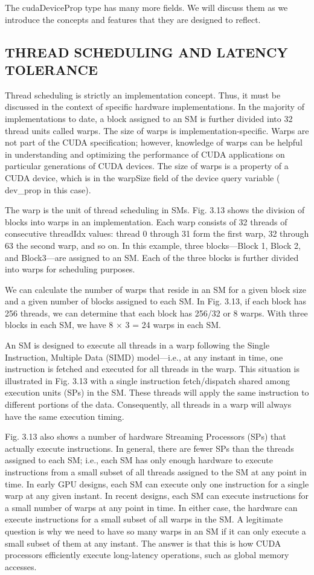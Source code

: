 \documentclass[11pt]{ctexart}
\begin{document}
The cudaDeviceProp type has many more fields. We will discuss them as we
introduce the concepts and features that they are designed to reflect.

\subsection{THREAD SCHEDULING AND LATENCY TOLERANCE}

Thread scheduling is strictly an implementation concept. Thus, it must be discussed in the context of specific hardware implementations. In the majority of implementations to date, a block assigned to an SM is further divided into 32 thread units called warps. The size of warps is implementation-specific. Warps are not part of the CUDA specification; however, knowledge of warps can be helpful in understanding
and optimizing the performance of CUDA applications on particular generations of CUDA devices. The size of warps is a property of a CUDA device, which is in the warpSize field of the device query variable ( dev\_prop in this case).

The warp is the unit of thread scheduling in SMs. Fig. 3.13 shows the division
of blocks into warps in an implementation. Each warp consists of 32 threads of consecutive threadIdx values: thread 0 through 31 form the first warp, 32 through 63 the second warp, and so on. In this example, three blocks—Block 1, Block 2, and Block3—are assigned to an SM. Each of the three blocks is further divided into warps for scheduling purposes.

We can calculate the number of warps that reside in an SM for a given block size and a given number of blocks assigned to each SM. In Fig. 3.13, if each block has 256 threads, we can determine that each block has 256/32 or 8 warps. With three blocks in each SM, we have 8 × 3 = 24 warps in each SM.

An SM is designed to execute all threads in a warp following the Single
Instruction, Multiple Data (SIMD) model—i.e., at any instant in time, one instruction is fetched and executed for all threads in the warp. This situation is illustrated in Fig. 3.13 with a single instruction fetch/dispatch shared among execution units (SPs) in the SM. These threads will apply the same instruction to different portions of the data. Consequently, all threads in a warp will always have the same execution timing.

Fig. 3.13 also shows a number of hardware Streaming Processors (SPs) that actually execute instructions. In general, there are fewer SPs than the threads assigned to each SM; i.e., each SM has only enough hardware to execute instructions from a small subset of all threads assigned to the SM at any point in time. In early GPU designs, each SM can execute only one instruction for a single warp at any given instant. In recent designs, each SM can execute instructions for a small number of warps at any point in time. In either case, the hardware can execute instructions for a small subset of all warps in the SM. A legitimate question is why we need to have so many warps in an SM if it can only execute a small subset of them at any instant. The answer is that this is how CUDA processors efficiently execute long-latency operations, such as global memory accesses.
\end{document}
